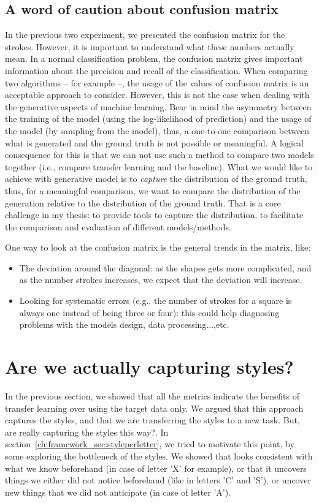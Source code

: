 \subsection{A word of caution about confusion matrix}
\par In the previous two experiment, we presented the confusion matrix for the strokes. However, it is important to understand what these numbers actually mean. In a normal classification problem, the confusion matrix gives important information about the precision and recall of the classification. When comparing two algorithms -- for example --, the usage of the values of confusion matrix is an acceptable approach to consider. However, this is not the case when dealing with the generative aspects of machine learning. Bear in mind the asymmetry between the training of the model (using the log-likelihood of prediction) and the usage of the model (by sampling from the model), thus, a one-to-one comparison between what is generated and the ground truth is not possible or meaningful. A logical consequence for this is that we can not use such a method to compare two models together (i.e., compare transfer learning and the baseline). What we would like to achieve with generative model is to \textit{capture} the distribution of the ground truth, thus, for a meaningful comparison, we want to compare the distribution of the generation relative to the distribution of the ground truth. That is a core challenge in my thesis: to provide tools to capture the distribution, to facilitate the comparison and evaluation of different models/methods.

\par One way to look at the confusion matrix is the general trends in the matrix, like:
\begin{itemize}
  \item The deviation around the diagonal: as the shapes gets more complicated, and as the number strokes increases, we expect that the deviation will increase.
  \item Looking for systematic errors (e.g., the number of strokes for a square is always one instead of being three or four): this could help diagnosing problems with the models design, data processing...,etc.
\end{itemize}

\section{Are we actually capturing styles?} \label{ch:seat_sec:rf}
\par In the previous section, we showed that all the metrics indicate the benefits of transfer learning over using the target data only. We argued that this approach captures the styles, and that we are transferring the styles to a new task. But, are really capturing the styles this way?. In section~\ref{ch:framework_sec:styleperletter}, we tried to motivate this point, by some exploring the bottleneck of the styles. We showed that looks consistent with what we know beforehand (in case of letter 'X' for example), or that it uncovers things we either did not notice beforehand (like in letters 'C' and 'S'), or uncover new things that we did not anticipate (in case of letter 'A').

